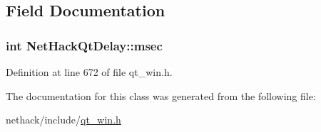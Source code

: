 \subsection{Field Documentation}
\hypertarget{classNetHackQtDelay_a2e7d4eb0045afd5915b5e1b679935c4b}{
\subsubsection[{msec}]{\setlength{\rightskip}{0pt plus 5cm}int Net\+Hack\+Qt\+Delay\+::msec\hspace{0.3cm}{\ttfamily [private]}}}\label{classNetHackQtDelay_a2e7d4eb0045afd5915b5e1b679935c4b}


Definition at line 672 of file qt\+\_\+win.\+h.



The documentation for this class was generated from the following file\+:\begin{DoxyCompactItemize}
\item 
nethack/include/\hyperlink{qt__win_8h}{qt\+\_\+win.\+h}\end{DoxyCompactItemize}
